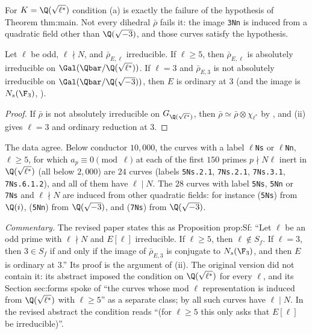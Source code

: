 For $K=\Q(\sqrt{\ell^*})$ condition (a) is exactly the failure of the hypothesis of Theorem thm:main. Not every dihedral $\bar\rho$ fails it: the
image \texttt{3Nn} is induced from a quadratic field other than $\Q(\sqrt{-3})$, and those curves satisfy the hypothesis.

\begin{theorem}\label{thm:galrep:lstar-automatic}
Let $\ell$ be odd, $\ell\nmid N$, and $\bar\rho_{E,\ell}$ irreducible. If $\ell\ge5$, then $\bar\rho_{E,\ell}$ is absolutely irreducible on $\Gal(\Qbar/\Q(\sqrt{\ell^*}))$. If $\ell=3$ and
$\bar\rho_{E,3}$ is not absolutely irreducible on $\Gal(\Qbar/\Q(\sqrt{-3}))$, then $E$ is ordinary at $3$ (and the image is $N_s(\F_3)$, ).
\end{theorem}

\begin{proof}
If $\bar\rho$ is not absolutely irreducible on $G_{\Q(\sqrt{\ell^*})}$, then $\bar\rho\simeq\bar\rho\otimes\chi_{\ell^*}$ by , and (ii)
gives $\ell=3$ and ordinary reduction at $3$.
\end{proof}

The data agree. Below conductor $10{,}000$, the curves with a label \texttt{$\ell$Ns} or \texttt{$\ell$Nn}, $\ell\ge5$, for which $a_p\equiv0\pmod\ell$ at each of the first
$150$ primes $p\nmid N\ell$ inert in $\Q(\sqrt{\ell^*})$ (all below $2{,}000$) are $24$ curves (labels \texttt{5Ns.2.1}, \texttt{7Ns.2.1}, \texttt{7Ns.3.1},
\texttt{7Ns.6.1.2}), and all of them have $\ell\mid N$. The $28$ curves with label \texttt{5Ns}, \texttt{5Nn} or \texttt{7Ns} and $\ell\nmid N$ are induced from
other quadratic fields: for instance  (\texttt{5Ns}) from $\Q(i)$,  (\texttt{5Nn}) from $\Q(\sqrt{-3})$, and 
(\texttt{7Ns}) from $\Q(\sqrt{-3})$.

\begin{paperlink}
\emph{Commentary.} The revised paper states this as Proposition prop:Sf: ``Let $\ell$ be an odd prime with $\ell\nmid N$ and $E[\ell]$ irreducible. If
$\ell\ge5$, then $\ell\notin S_f$. If $\ell=3$, then $3\in S_f$ if and only if the image of $\bar\rho_{E,3}$ is conjugate to $N_s(\F_3)$, and then $E$ is ordinary at
$3$.'' Its proof is the argument of (ii). The original version did not contain it: its abstract imposed the
condition on $\Q(\sqrt{\ell^*})$ for every $\ell$, and its Section sec:forms spoke of ``the curves whose mod $\ell$ representation is induced from
$\Q(\sqrt{\ell^*})$ with $\ell\ge5$'' as a separate class; by  all such curves have $\ell\mid N$. In the revised abstract the
condition reads ``(for $\ell\ge5$ this only asks that $E[\ell]$ be irreducible)''.
\end{paperlink}

